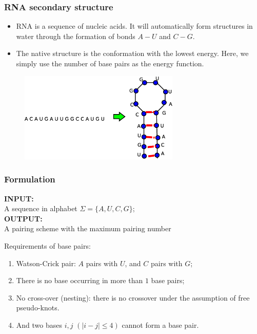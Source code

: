 \documentclass[mathserif]{beamer}
\begin{document}

\frame
{
  \frametitle{RNA secondary structure}
  \begin{itemize}
   \item RNA is a sequence of nucleic acids. It will automatically form structures in water through the formation of bonds $A-U$ and $C-G$. 
\item The native structure is the conformation with the lowest energy. Here, we simply use the number of base pairs as the energy function. 
  \end{itemize}
	\begin{figure}
	\includegraphics[width=3in]{L6-RNA.eps}
	\end{figure}
}

\frame
{
  \frametitle{Formulation}

\begin{block}{}
{\bf  INPUT: }\\ A sequence in alphabet $\Sigma=\{A, U, C, G\}$;	\\
{\bf OUTPUT: }\\ A pairing scheme with the maximum pairing number
\end{block}

Requirements of base pairs: 
\begin{enumerate}
	 \item Watson-Crick pair: $A$ pairs with $U$, and $C$ pairs with $G$;
 	\item There is no base occurring in more than $1$ base pairs; 
 	\item No cross-over (nesting): there is no crossover under the assumption of free pseudo-knots. 
 	\item And two bases $i, j $ $(|i-j| \leq 4)$ cannot form a base pair. 
\end{enumerate}

}

\end{document}
